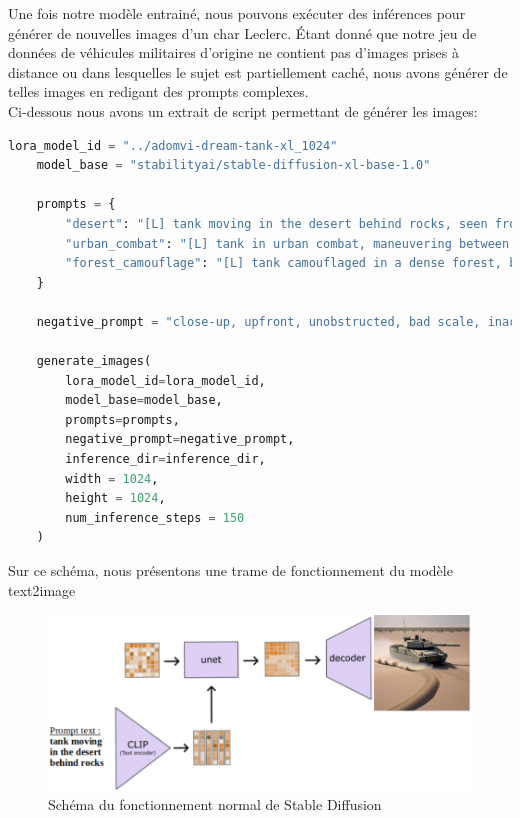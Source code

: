 Une fois notre modèle entrainé, nous pouvons exécuter des inférences pour générer de nouvelles images d'un char Leclerc.
Étant donné que notre jeu de données de véhicules militaires d'origine ne contient pas d'images prises à distance ou dans lesquelles le sujet est partiellement caché, nous avons générer de telles images en redigant des prompts complexes.\\

Ci-dessous nous avons un extrait de script permettant de générer les images:
\begin{lstlisting}[language=Python, basicstyle=\footnotesize\ttfamily, breaklines=true]
    lora_model_id = "../adomvi-dream-tank-xl_1024"
    model_base = "stabilityai/stable-diffusion-xl-base-1.0"
    
    prompts = {
        "desert": "[L] tank moving in the desert behind rocks, seen from the top of a distant hill, respecting realistic scale and dimensions",
        "urban_combat": "[L] tank in urban combat, maneuvering between buildings, seen from a high-rise far away, respecting realistic scale and dimensions",
        "forest_camouflage": "[L] tank camouflaged in a dense forest, barely visible among trees, seen from very far away, respecting realistic scale and dimensions",
    }
    
    negative_prompt = "close-up, upfront, unobstructed, bad scale, inaccurate canons, extra canons, out of frame, lowres, text, error, cropped, worst quality, low quality, jpeg artifacts, duplicate, bad proportions, extra elements, malformed structures"
    
    generate_images(
        lora_model_id=lora_model_id,
        model_base=model_base,
        prompts=prompts,
        negative_prompt=negative_prompt,
        inference_dir=inference_dir,
        width = 1024,
        height = 1024,
        num_inference_steps = 150
    )
\end{lstlisting}

Sur ce schéma, nous présentons une trame de fonctionnement du modèle text2image
\begin{figure}[H]
    \center
    \includegraphics[width=\textwidth]{./images/shema_sd.png}
    \caption{Schéma du fonctionnement normal de Stable Diffusion}
\end{figure}



